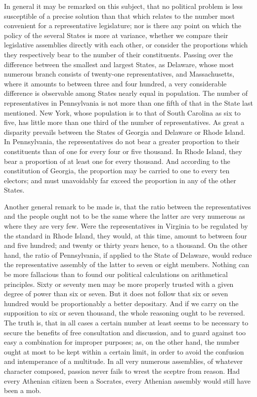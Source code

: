 In general it may be remarked on this subject, that no political problem is less susceptible of a precise solution than that which relates to the number most convenient for a representative legislature; nor is there any point on which the policy of the several States is more at variance, whether we compare their legislative assemblies directly with each other, or consider the proportions which they respectively bear to the number of their constituents. 
Passing over the difference between the smallest and largest States, as Delaware, whose most numerous branch consists of twenty-one representatives, and Massachusetts, where it amounts to between three and four hundred, a very considerable difference is observable among States nearly equal in population. 
The number of representatives in Pennsylvania is not more than one fifth of that in the State last mentioned. 
New York, whose population is to that of South Carolina as six to five, has little more than one third of the number of representatives. 
As great a disparity prevails between the States of Georgia and Delaware or Rhode Island. 
In Pennsylvania, the representatives do not bear a greater proportion to their constituents than of one for every four or five thousand. 
In Rhode Island, they bear a proportion of at least one for every thousand. 
And according to the constitution of Georgia, the proportion may be carried to one to every ten electors; and must unavoidably far exceed the proportion in any of the other States.

Another general remark to be made is, that the ratio between the representatives and the people ought not to be the same where the latter are very numerous as where they are very few. 
Were the representatives in Virginia to be regulated by the standard in Rhode Island, they would, at this time, amount to between four and five hundred; and twenty or thirty years hence, to a thousand. 
On the other hand, the ratio of Pennsylvania, if applied to the State of Delaware, would reduce the representative assembly of the latter to seven or eight members. 
Nothing can be more fallacious than to found our political calculations on arithmetical principles. 
Sixty or seventy men may be more properly trusted with a given degree of power than six or seven. 
But it does not follow that six or seven hundred would be proportionably a better depositary. 
And if we carry on the supposition to six or seven thousand, the whole reasoning ought to be reversed. 
The truth is, that in all cases a certain number at least seems to be necessary to secure the benefits of free consultation and discussion, and to guard against too easy a combination for improper purposes; as, on the other hand, the number ought at most to be kept within a certain limit, in order to avoid the confusion and intemperance of a multitude. 
In all very numerous assemblies, of whatever character composed, passion never fails to wrest the sceptre from reason. 
Had every Athenian citizen been a Socrates, every Athenian assembly would still have been a mob.

